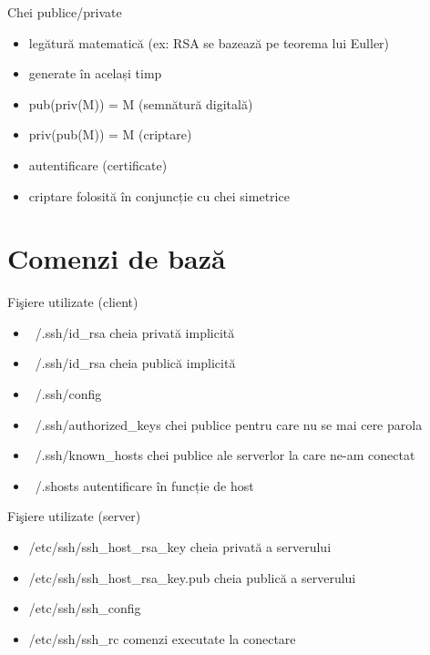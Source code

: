 \documentclass{beamer}
\begin{document}
\begin{frame}{Chei publice/private}
  \begin{itemize}
    \item legătură matematică (ex: RSA se bazează pe teorema lui Euller)
    \item generate în același timp
    \item pub(priv(M)) = M (semnătură digitală)
    \item priv(pub(M)) = M (criptare)
    \item autentificare (certificate)
    \item criptare folosită în conjuncție cu chei simetrice
  \end{itemize}
\end{frame}

\section{Comenzi de bază}
\frame{\tableofcontents[currentsection]}

\begin{frame}{Fişiere utilizate (client)}
	\begin{itemize}
		\item ~/.ssh/id\_rsa cheia privată implicită
		\item ~/.ssh/id\_rsa cheia publică implicită
		\item ~/.ssh/config 
		\item ~/.ssh/authorized\_keys chei publice pentru care nu se mai cere
			parola
		\item ~/.ssh/known\_hosts chei publice ale serverlor la care ne-am
			conectat
		\item ~/.shosts autentificare în funcție de host
	\end{itemize}
\end{frame}

\begin{frame}{Fişiere utilizate (server)}
	\begin{itemize}
		\item /etc/ssh/ssh\_host\_rsa\_key cheia privată a serverului
		\item /etc/ssh/ssh\_host\_rsa\_key.pub cheia publică a serverului
		\item /etc/ssh/ssh\_config
		\item /etc/ssh/ssh\_rc	comenzi executate la conectare
	\end{itemize}
\end{frame}
\end{document}
